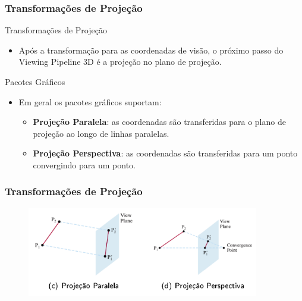 \documentclass{beamer}
\begin{document}
\begin{frame}
\frametitle{Transformações de Projeção}
	\begin{block}{Transformações de Projeção}
		\begin{itemize}
			\item Após a transformação para as coordenadas de visão, o próximo passo do Viewing Pipeline 3D é a projeção no plano de projeção.
		\end{itemize}
	\end{block}

	\begin{block}{Pacotes Gráficos}
		\begin{itemize}
			\item Em geral os pacotes gráficos suportam:
				\begin{itemize}
					\item \textbf{Projeção Paralela}: as coordenadas são transferidas para o plano de projeção ao longo de linhas paralelas.
					\item \textbf{Projeção Perspectiva}: as coordenadas são transferidas para um ponto convergindo para um ponto.
				\end{itemize}
		\end{itemize}
	\end{block}
\end{frame}


\begin{frame}
\frametitle{Transformações de Projeção}
	\begin{figure}[!h]
			\begin{center}
			\includegraphics[width=0.9\textwidth]{Figures/TipProj}
			\end{center}
	\end{figure}
\end{frame}

\end{document}
